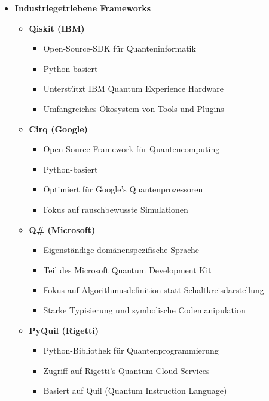 \begin{itemize}
    \item \textbf{Industriegetriebene Frameworks}
    \begin{itemize}
        \item \textbf{Qiskit (IBM)}
        \begin{itemize}
            \item Open-Source-SDK für Quanteninformatik
            \item Python-basiert
            \item Unterstützt IBM Quantum Experience Hardware
            \item Umfangreiches Ökosystem von Tools und Plugins
        \end{itemize}
        
        \item \textbf{Cirq (Google)}
        \begin{itemize}
            \item Open-Source-Framework für Quantencomputing
            \item Python-basiert
            \item Optimiert für Google's Quantenprozessoren
            \item Fokus auf rauschbewusste Simulationen
        \end{itemize}
        
        \item \textbf{Q\# (Microsoft)}
        \begin{itemize}
            \item Eigenständige domänenspezifische Sprache
            \item Teil des Microsoft Quantum Development Kit
            \item Fokus auf Algorithmusdefinition statt Schaltkreisdarstellung
            \item Starke Typisierung und symbolische Codemanipulation
        \end{itemize}
        
        \item \textbf{PyQuil (Rigetti)}
        \begin{itemize}
            \item Python-Bibliothek für Quantenprogrammierung
            \item Zugriff auf Rigetti's Quantum Cloud Services
            \item Basiert auf Quil (Quantum Instruction Language)
        \end{itemize}
    \end{itemize}
    

\end{itemize}

